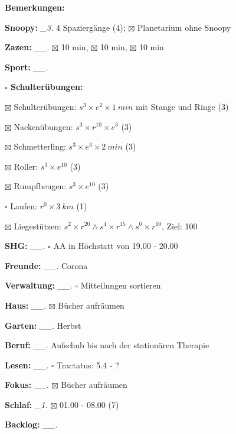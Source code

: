 \documentclass[10pt,a4paper]{article}
\newcommand\prop[1] {{\color {alizarin} {\bf #1}}}        %
\newcommand\mand[1] {{\color {burntorange} {\bf #1}}}     %
\newcommand\topspace{\vskip -15pt \hskip 20pt}
\newcommand\bottomspace{\vskip 4pt}
\newcommand\n[1] { {\sl #1.} \hskip 5pt }
\begin{document}
\begin{mdframed}[style=daystyle]
\begin{labeling}{{\mand {Bemerkungen:}}}
      \bottomspace
  \item[{\mand {Snoopy:}}]        \n{\_3} 4 Spaziergänge (4); $\boxtimes$ Planetarium ohne Snoopy
  \item[{\mand {Zazen:}}]        \n{\_\_} $\boxtimes$ 10 min, $\boxtimes$ 10 min, $\boxtimes$ 10 min
  \item[{\mand {Sport:}}]        \n{\_\_}
    \topspace
    \begin{minipage}{0.75\textwidth}  
      \begin{labeling}{\prop {$\square$ {Schulterübungen:}}} 
        \setlength\itemsep{-3pt}
      \item[$\boxtimes$ Schulterübungen:] $s^3 \times e^2 \times 1\ min$ mit Stange und Ringe (3)
      \item[$\boxtimes$ Nackenübungen:]   $s^3 \times r^{10} \times e^3$ (3)
      \item[$\boxtimes$ Schmetterling:]   $s^3 \times e^3 \times 2\ min$ (3)
      \item[$\boxtimes$ Roller:]          $s^3 \times e^{10}$ (3)
      \item[$\boxtimes$ Rumpfbeugen:]     $s^3 \times e^{10}$ (3)
      \item[$\square$ Laufen:]          $r^0 \times 3\ km$ (1)
      \item[$\boxtimes$ Liegestützen:]    $s^2 \times r^{20} \land s^4 \times r^{15} \land s^0 \times r^{10}$, Ziel: 100
      \end{labeling}
    \end{minipage}
    \bottomspace        
  \item[{\mand {SHG:}}]          \n{\_\_} $\square$ AA in Höchstatt von 19.00 - 20.00
  \item[{\mand {Freunde:}}]      \n{\_\_} Corona
  \item[{\mand {Verwaltung:}}]   \n{\_\_} $\square$ Mitteilungen sortieren
  \item[{\mand {Haus:}}]         \n{\_\_} $\boxtimes$ Bücher aufräumen
  \item[{\mand {Garten:}}]       \n{\_\_} Herbst
  \item[{\mand {Beruf:}}]        \n{\_\_} Aufschub bis nach der stationären Therapie
  \item[{\mand {Lesen:}}]        \n{\_\_} $\square$ Tractatus: 5.4 - ?
  \item[{\mand {Fokus:}}]        \n{\_\_} $\boxtimes$ Bücher aufräumen
  \item[{\mand {Schlaf:}}]        \n{\_1} $\boxtimes$ 01.00 - 08.00 (7)
  \item[{\mand {Backlog:}}]      \n{\_\_} 

\end{labeling}
\end{mdframed}
\end{document}
